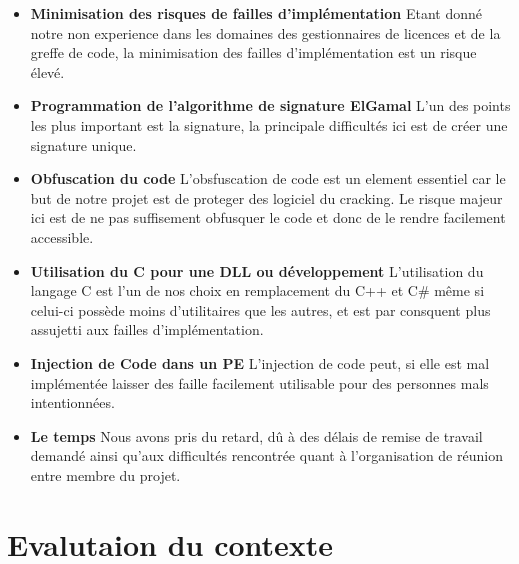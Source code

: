 \begin{itemize}
	\item \textbf{Minimisation des risques de failles d'implémentation} \newline
	Etant donné notre non experience dans les domaines des gestionnaires de licences
	et de la greffe de code, la minimisation des failles d'implémentation est un risque élevé.\newline
	
	\item \textbf{Programmation de l'algorithme de signature ElGamal} \newline
	L'un des points les plus important est la signature, la principale difficultés ici est 
	de créer une signature unique.	\newline
	
	\item \textbf{Obfuscation du code} \newline
	L'obsfuscation de code est un element essentiel car le but de notre projet est de proteger des
	logiciel du cracking. Le risque majeur ici est de ne pas suffisement obfusquer le code et donc de le rendre 
	facilement accessible.\newline
	
	\item \textbf{Utilisation du C pour une DLL ou développement} \newline
	L'utilisation du langage C est l'un de nos choix en remplacement du C++ et C\# même si celui-ci
	possède moins d'utilitaires que les autres, et est par consquent plus assujetti aux failles d'implémentation.\newline
	
	\item \textbf{Injection de Code dans un PE} \newline
	L'injection de code peut, si elle est mal implémentée laisser des faille facilement utilisable
	pour des personnes mals intentionnées.\newline
	
	\item \textbf{Le temps} \newline
	Nous avons pris du retard, dû à des délais de remise de travail demandé ainsi qu'aux 
	difficultés rencontrée quant à l'organisation de réunion entre membre du projet.\newline
\end{itemize}

\chapter{Evalutaion du contexte}

